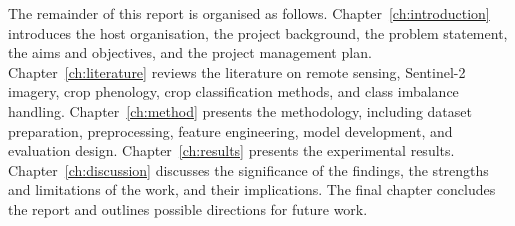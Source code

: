 The remainder of this report is organised as follows.
Chapter~\ref{ch:introduction} introduces the host organisation, the project
background, the problem statement, the aims and objectives, and the project
management plan. Chapter~\ref{ch:literature} reviews the literature on remote
sensing, Sentinel-2 imagery, crop phenology, crop classification methods, and
class imbalance handling. Chapter~\ref{ch:method} presents the methodology,
including dataset preparation, preprocessing, feature engineering, model
development, and evaluation design. Chapter~\ref{ch:results} presents the
experimental results. Chapter~\ref{ch:discussion} discusses the significance
of the findings, the strengths and limitations of the work, and their
implications. The final chapter concludes the report and outlines possible
directions for future work.